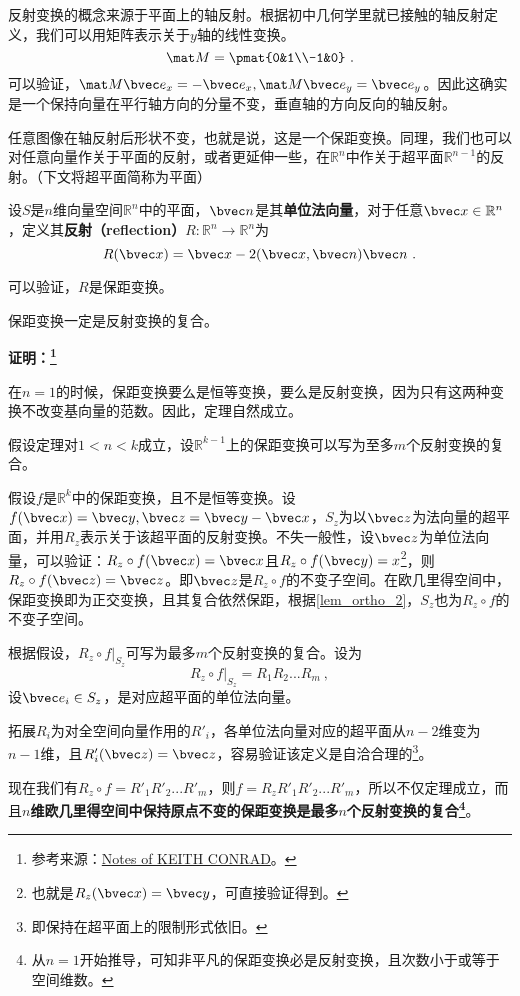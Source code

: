 反射变换的概念来源于平面上的轴反射。根据初中几何学里就已接触的轴反射定义，我们可以用矩阵表示关于$y$轴的线性变换。
\begin{equation}
\mat M=\pmat{0&1\\-1&0}~.
\end{equation}
可以验证，$\mat M\bvec e_x=-\bvec e_x,\mat M \bvec e_y=\bvec e_y$。因此这确实是一个保持向量在平行轴方向的分量不变，垂直轴的方向反向的轴反射。

任意图像在轴反射后形状不变，也就是说，这是一个保距变换。同理，我们也可以对任意向量作关于平面的反射，或者更延伸一些，在$\mathbb R^n$中作关于超平面$\mathbb R^{n-1}$的反射。（下文将超平面简称为平面）
\begin{definition}{}
设$S$是$n$维向量空间$\mathbb R^n$中的平面，$\bvec n$是其\textbf{单位法向量}，对于任意$\bvec x\in \mathbb R^n$，定义其\textbf{反射（reflection）}$R:\mathbb R^n\rightarrow \mathbb R^n$为
\begin{equation}
R(\bvec x)=\bvec x-2(\bvec x,\bvec n)\bvec n~.
\end{equation}
\end{definition}
可以验证，$R$是保距变换。


\begin{theorem}{}
保距变换一定是反射变换的复合。
\end{theorem}
\textbf{证明：\footnote{参考来源：\href{https://kconrad.math.uconn.edu/blurbs/grouptheory/isometryRn.pdf}{Notes of KEITH CONRAD}。}}

在$n=1$的时候，保距变换要么是恒等变换，要么是反射变换，因为只有这两种变换不改变基向量的范数。因此，定理自然成立。

假设定理对$1<n<k$成立，设$\mathbb R^{k-1}$上的保距变换可以写为至多$m$个反射变换的复合。 

假设$f$是$\mathbb R^k$中的保距变换，且不是恒等变换。设$f(\bvec x)=\bvec y,\bvec z=\bvec y-\bvec x$，$S_z$为以$\bvec z$为法向量的超平面，并用$R_z$表示关于该超平面的反射变换。不失一般性，设$\bvec z$为单位法向量，可以验证：$R_z\circ f(\bvec x)=\bvec x$且$R_z\circ f(\bvec y)=x$\footnote{也就是$R_z(\bvec x)=\bvec y$，可直接验证得到。}，则$R_z\circ f(\bvec z)=\bvec z$。即$\bvec z$是$R_z\circ f$的不变子空间。在欧几里得空间中，保距变换即为正交变换，且其复合依然保距，根据\autoref{lem_ortho_2}，$S_z$也为$R_z\circ f$的不变子空间。

根据假设，$R_z\circ f|_{S_z}$可写为最多$m$个反射变换的复合。设为
\begin{equation}
R_z\circ f|_{S_z}=R_1R_2...R_{m}~,
\end{equation}
设$\bvec e_i\in S_z$，是对应超平面的单位法向量。

拓展$R_i$为对全空间向量作用的$R'_i$，各单位法向量对应的超平面从$n-2$维变为$n-1$维，且$R'_i(\bvec z)=\bvec z$，容易验证该定义是自洽合理的\footnote{即保持在超平面上的限制形式依旧。}。

现在我们有$R_z \circ f=R'_1R'_2...R'_{m}$，则$f=R_zR'_1R'_2...R'_{m}$，所以不仅定理成立，而且\textbf{$n$维欧几里得空间中保持原点不变的保距变换是最多$n$个反射变换的复合\footnote{从$n=1$开始推导，可知非平凡的保距变换必是反射变换，且次数小于或等于空间维数。}}。
